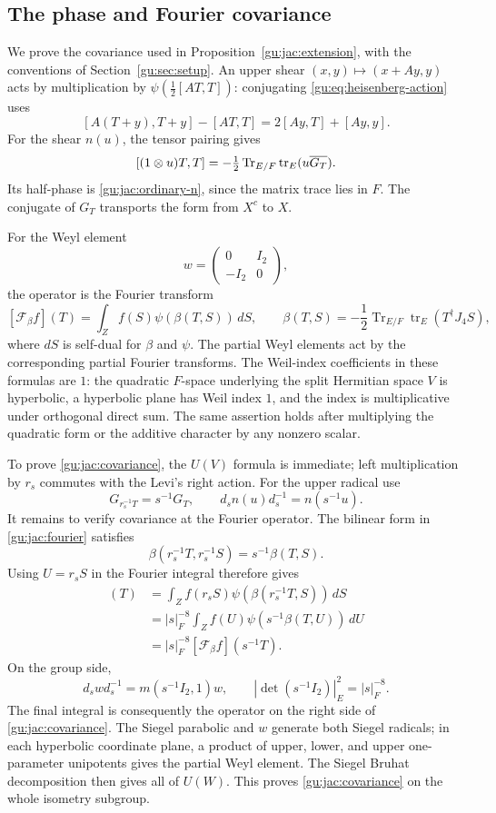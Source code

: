\label{gu:app:normalization}
\subsection{The phase and Fourier covariance}
We prove the covariance used in Proposition~\ref{gu:jac:extension}, with
the conventions of Section~\ref{gu:sec:setup}. An upper shear
$(x,y)\mapsto(x+Ay,y)$ acts by multiplication by
$\psi(\tfrac12[AT,T])$: conjugating \eqref{gu:eq:heisenberg-action} uses
\[
 [A(T+y),T+y]-[AT,T]=2[Ay,T]+[Ay,y].
\]
For the shear $n(u)$, the tensor pairing gives
\[
 [(1\otimes u)T,T]
 =-\tfrac12\operatorname{Tr}_{E/F}\operatorname{tr}_E(u\overline{G_T}).
\]
Its half-phase is \eqref{gu:jac:ordinary-n}, since the matrix trace lies
in $F$. The conjugate of $G_T$ transports the form from $X^c$ to $X$.

For the Weyl element
\[
 w=\begin{pmatrix}0&I_2\\-I_2&0\end{pmatrix},
\]
the operator is the Fourier transform
\begin{equation}\label{gu:jac:fourier}
 [\mathcal F_\beta f](T)
 =\int_Zf(S)\psi(\beta(T,S))\,dS,
 \qquad
 \beta(T,S)=-\frac12\operatorname{Tr}_{E/F}
                         \operatorname{tr}_E(T^\dagger J_4S),
\end{equation}
where $dS$ is self-dual for $\beta$ and $\psi$.  The partial Weyl elements
act by the corresponding partial Fourier transforms.  The Weil-index
coefficients in these formulas are $1$: the quadratic $F$-space underlying
the split Hermitian space $V$ is hyperbolic, a hyperbolic plane has Weil
index $1$, and the index is multiplicative under orthogonal direct sum.
The same assertion holds after multiplying the quadratic form or the
additive character by any nonzero scalar.

To prove \eqref{gu:jac:covariance}, the $U(V)$ formula is immediate;
left multiplication by $r_s$ commutes with the Levi's right action.
For the upper radical use
\[
 G_{r_s^{-1}T}=s^{-1}G_T,\qquad
 d_sn(u)d_s^{-1}=n(s^{-1}u).
\]
It remains to verify covariance at the Fourier operator.  The bilinear
form in \eqref{gu:jac:fourier} satisfies
\[
 \beta(r_s^{-1}T,r_s^{-1}S)=s^{-1}\beta(T,S).
\]
Using $U=r_sS$ in the Fourier integral therefore gives
\begin{align*}
 [D_s\mathcal F_\beta D_s^{-1}f](T)
 &=\int_Z f(r_sS)\psi(\beta(r_s^{-1}T,S))\,dS\\
 &=|s|_F^{-8}\int_Z f(U)\psi(s^{-1}\beta(T,U))\,dU\\
 &=|s|_F^{-8}[\mathcal F_\beta f](s^{-1}T).
\end{align*}
On the group side,
\[
 d_swd_s^{-1}=m(s^{-1}I_2,1)w,
 \qquad |\det(s^{-1}I_2)|_E^2=|s|_F^{-8}.
\]
The final integral is consequently the operator on the right
side of \eqref{gu:jac:covariance}. The Siegel parabolic and $w$ generate
both Siegel radicals; in each hyperbolic
coordinate plane, a product of upper, lower, and upper one-parameter
unipotents gives the partial Weyl element.  The Siegel Bruhat
decomposition then gives all of $U(W)$.  This proves
\eqref{gu:jac:covariance} on the whole isometry subgroup.

